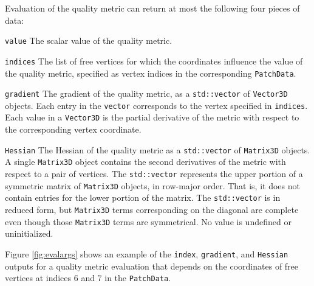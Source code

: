 \documentclass{article}
\begin{document}
Evaluation of the quality metric can return at most the following four pieces of data:
\begin{description}
\item{\texttt{value} } The scalar value of the quality metric.
\item{\texttt{indices} } The list of free vertices for which the coordinates influence the value of the quality metric, specified as vertex indices in the corresponding \texttt{PatchData}.
\item{\texttt{gradient} } The gradient of the quality metric, as a \texttt{std::vector} of \texttt{Vector3D} objects.  Each entry in the \texttt{vector} corresponds to the vertex specified in \texttt{indices}.  Each value in a \texttt{Vector3D} is the partial derivative of the metric with respect to the corresponding vertex coordinate.
\item{\texttt{Hessian} } The Hessian of the quality metric as a \texttt{std::vector} of \texttt{Matrix3D} objects.  A single \texttt{Matrix3D} object contains the second derivatives of the metric with respect to a pair of vertices.  The \texttt{std::vector} represents the upper portion of a symmetric matrix of \texttt{Matrix3D} objects, in row-major order.  That is, it does not contain entries for the lower portion of the matrix.  The \texttt{std::vector} is in reduced form, but \texttt{Matrix3D} terms corresponding on the diagonal are complete even though those \texttt{Matrix3D} terms are symmetrical.  No value is undefined or uninitialized.
\end{description}
Figure \ref{fig:evalargs} shows an example of the \texttt{index}, \texttt{gradient}, and \texttt{Hessian} outputs for a quality metric evaluation that depends on the coordinates of free vertices at indices 6 and 7 in the \texttt{PatchData}.
\end{document}
